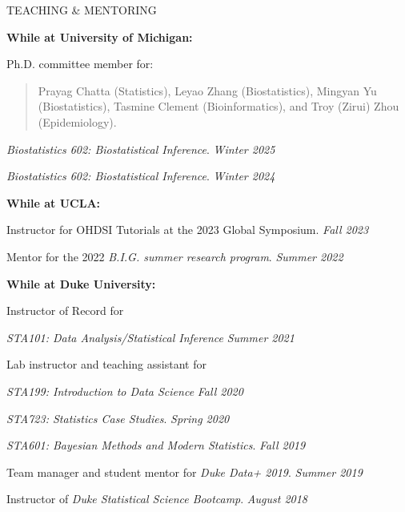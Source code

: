 \documentclass{resume} %
\begin{document}
\begin{rSection}{TEACHING \& MENTORING}
	
\hspace*{-0.2in}\textbf{While at University of Michigan:}

Ph.D.  committee member for: 

\begin{quote}
	Prayag Chatta (Statistics), Leyao Zhang (Biostatistics),  Mingyan Yu (Biostatistics), Tasmine Clement (Bioinformatics), and Troy (Zirui) Zhou (Epidemiology). 
\end{quote}
	

    \emph{Biostatistics 602: Biostatistical Inference}.  \hfill {\em Winter 2025}


 \emph{Biostatistics 602: Biostatistical Inference}.  \hfill {\em Winter 2024}

\smallskip 

\hspace*{-0.2in}\textbf{While at UCLA:}
	
	Instructor for OHDSI Tutorials at the 2023 Global Symposium.  \hfill {\em Fall 2023}
		
	Mentor for the 2022 \emph{B.I.G. summer research program}.  \hfill {\em Summer 2022}
	
\smallskip 
	
\hspace*{-0.2in}\textbf{While at Duke University:}
	
	Instructor of Record for 
	
	\emph{STA101: Data Analysis/Statistical Inference} \hfill {\em Summer 2021}
	
	Lab instructor and teaching assistant for 
	
	\hspace{0.2in} \emph{STA199: Introduction to Data Science} \hfill {\em Fall 2020}
	
	\hspace{0.2in} \emph{STA723: Statistics Case Studies}. \hfill {\em Spring 2020}
	
	\hspace{0.2in} \emph{STA601: Bayesian Methods and Modern Statistics}. \hfill {\em Fall 2019}
	
	
	Team manager and student mentor for \emph{Duke Data+ 2019}. \hfill {\em Summer 2019}
	
	Instructor of \emph{Duke Statistical Science Bootcamp}. \hfill {\em August 2018}
\end{rSection}
\end{document}
